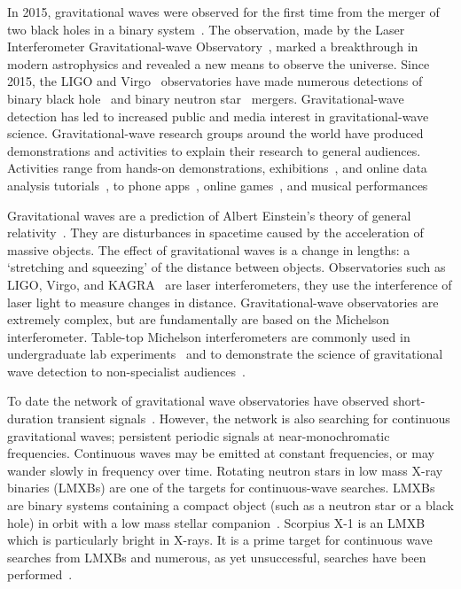 \documentclass[paper-main.tex]{subfiles}
\begin{document}
In 2015, gravitational waves were observed for the first time from the merger of two black holes in a binary system~\cite{GW150914}. 
The observation, made by the Laser Interferometer Gravitational-wave Observatory~\citep[LIGO]{AdvancedLIGO:2015}, marked a breakthrough in modern astrophysics and revealed a new means to observe the universe. 
Since 2015, the LIGO and Virgo~\cite{AdvancedVirgo:2015} observatories have made numerous detections of binary black hole~\cite{GW151226,GW170104,GW170814} and binary neutron star~\cite{GW170817,GW170817multi,GW190425} mergers. 
Gravitational-wave detection has led to increased public and media interest in gravitational-wave science. 
Gravitational-wave research groups around the world have produced demonstrations and activities to explain their research to general audiences. 
Activities range from hands-on demonstrations, exhibitions~\cite{TTExhibit:2020,LIGOScienceEducationCentre:online,GravityDiscoveryCentre:online}, and online data analysis tutorials~\cite{GWOSC:online,LOSC:2015}, to phone apps~\cite{LaserLabs:online,SciVR:online,chirp:online}, online games~\cite{BlackHoleHunter:online}, and musical performances~\cite{ArthurJeffesMusic:online,GravitySynthLeonTrimble:online}%

Gravitational waves are a prediction of Albert Einstein's theory of general relativity~\cite{Einstein:1916}. 
They are disturbances in spacetime caused by the acceleration of massive objects. 
The effect of gravitational waves is a change in lengths: a `stretching and squeezing' of the distance between objects.
Observatories such as LIGO, Virgo, and KAGRA~\cite{KAGRA:2013} are laser interferometers, they use the interference of laser light to measure changes in distance. 
Gravitational-wave observatories are extremely complex, but are fundamentally are based on the Michelson interferometer. 
Table-top Michelson interferometers are commonly used in undergraduate lab experiments~\cite{UgoliniEtAl:2019} and to demonstrate the science of gravitational wave detection to non-specialist audiences~\cite{ThorLabsIFO,NikhefIFO,TTExhibit:2020,LIGOIFOGlue,LIGOIFOMagnets}.

To date the network of gravitational wave observatories have observed short-duration transient signals~\cite{GWTC-1:2018,GWOSC:online}. 
However, the network is also searching for continuous gravitational waves; persistent periodic signals at near-monochromatic frequencies.
Continuous waves may be emitted at constant frequencies, or may wander slowly in frequency over time. 
Rotating neutron stars in low mass X-ray binaries (LMXBs) are one of the targets for continuous-wave searches. 
LMXBs are binary systems containing a compact object (such as a neutron star or a black hole) in orbit with a low mass stellar companion~\cite{xraybinaries:1997}. 
Scorpius X-1 is an LMXB which is particularly bright in X-rays. 
It is a prime target for continuous wave searches from LMXBs and numerous, as yet unsuccessful, searches have been performed~\cite{ScoX1O2Viterbi:2019,RadiometerO1O2:2019,SearchCrossCorrO1:2017}.
\end{document}
